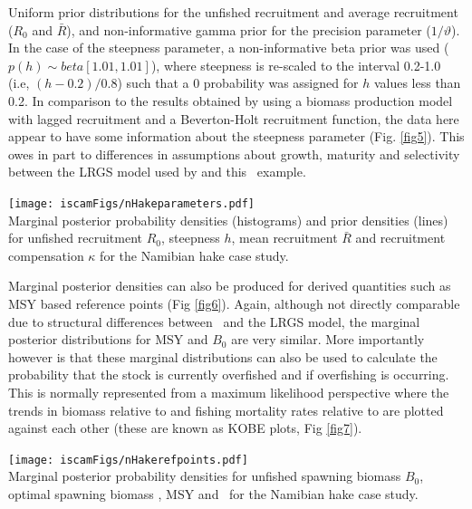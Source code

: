 \begin{multicols}{2}
Uniform prior distributions for the unfished recruitment and average recruitment ($R_0$ and $\bar{R}$), and non-informative gamma prior for the precision parameter ($1/\vartheta$).  In the case of the steepness parameter, a non-informative beta prior was used ($p(h)\sim beta[1.01,1.01]$), where steepness is re-scaled to the interval 0.2-1.0 (i.e, $(h-0.2)/0.8$) such that a 0 probability was assigned for $h$ values less than 0.2.  In comparison to the results obtained by \cite{hilborn1997ecological} using a biomass production model with lagged recruitment and a Beverton-Holt recruitment function, the data here appear to have some information about the steepness parameter (Fig. \ref{fig5}).  This owes in part to differences in assumptions about growth, maturity and selectivity between the LRGS model used by \cite{hilborn1997ecological} and this \iscam\ example.

\begin{figurehere}
	\centering
	\texttt{[image: iscamFigs/nHakeparameters.pdf]}\\
	\caption{Marginal posterior probability densities (histograms) and prior densities (lines) for unfished recruitment $R_0$, steepness $h$, mean recruitment $\bar{R}$ and recruitment compensation $\kappa$ for the Namibian hake case study.}\label{fig5}
\end{figurehere}

Marginal posterior densities can also be produced for derived quantities such as MSY based reference points (Fig \ref{fig6}).   Again, although not directly comparable due to structural differences between \iscam\ and the LRGS model, the marginal posterior distributions for MSY and $B_0$ are very similar.  More importantly however is that these marginal distributions can also be used to calculate the probability that the stock is currently overfished and if overfishing is occurring.  This is normally represented from a maximum likelihood perspective where the trends in biomass relative to \bmsy and fishing mortality rates relative to \fmsy are plotted against each other (these are known as KOBE plots, Fig \ref{fig7}).

\begin{figurehere}
	\centering
	\texttt{[image: iscamFigs/nHakerefpoints.pdf]}\\
	\caption{Marginal posterior probability densities for unfished spawning biomass $B_0$, optimal spawning biomass \bmsy, MSY and \fmsy\ for the Namibian hake case study.}\label{fig6}
\end{figurehere}


\end{multicols}
